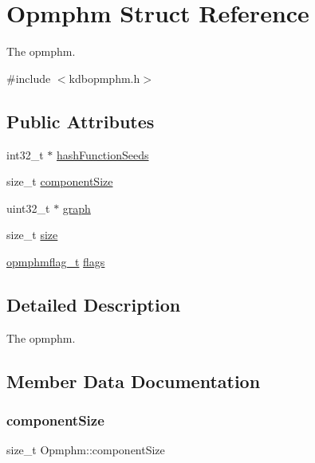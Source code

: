 \hypertarget{structOpmphm}{}\section{Opmphm Struct Reference}
\label{structOpmphm}


The opmphm.  




{\ttfamily \#include $<$kdbopmphm.\+h$>$}

\subsection*{Public Attributes}
\begin{DoxyCompactItemize}
\item 
int32\+\_\+t $\ast$ \hyperlink{structOpmphm_a522b3ab16ceb22828b54333868c9324d}{hash\+Function\+Seeds}
\item 
size\+\_\+t \hyperlink{structOpmphm_a01441fc04bd56fd6253ca4265364d39c}{component\+Size}
\item 
uint32\+\_\+t $\ast$ \hyperlink{structOpmphm_a9346a5fabe0c3a96abd70bb18cbd7fa2}{graph}
\item 
size\+\_\+t \hyperlink{structOpmphm_a72e7343b4ea87b27891e760f03fd2b96}{size}
\item 
\hyperlink{kdbopmphm_8h_a2485eafcb5c3e235f15e91d98ec39eef}{opmphmflag\+\_\+t} \hyperlink{structOpmphm_af321bfb7ed0bd9fc2c62a4b07568e3c6}{flags}
\end{DoxyCompactItemize}


\subsection{Detailed Description}
The opmphm. 

\subsection{Member Data Documentation}
\mbox{\label{structOpmphm_a01441fc04bd56fd6253ca4265364d39c}} 
\subsubsection{\texorpdfstring{component\+Size}{componentSize}}
{\footnotesize\ttfamily size\+\_\+t Opmphm\+::component\+Size}

